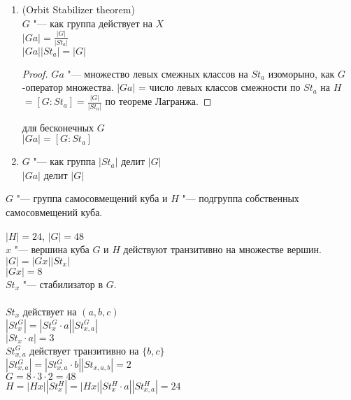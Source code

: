 \begin{conseq}\hfill
\begin{enumerate}
\item (Orbit Stabilizer theorem)\\
$G$ "--- как группа действует на $X$\\
$|Ga| = \frac{|G|}{|St_a|}$\\
$|Ga||St_a| = |G|$\\
\begin{proof}
$Ga$ "--- множество левых смежных классов на $St_a$ изоморыно, как $G$-оператор
множества.
$|Ga|$ = число левых классов смежности по $St_a$ на $H$
$= [G \colon St_a] = \frac{|G|}{|St_a|}$ по теореме Лагранжа.
\end{proof}
\begin{Rem}
для бесконечных $G$\\
$|Ga| = [G \colon St_a]$\\
\end{Rem}
\item
$G$ "--- как группа $|St_a|$ делит $|G|$\\
                    $|Ga|$ делит $|G|$\\
\end{enumerate}
\end{conseq}
\begin{exmp}
$G$ "--- группа самосовмещений куба и $H$ "--- подгруппа собственных самосовмещений куба.

$|H| = 24$, $|G| = 48$\\

$x$ "--- вершина куба $G$ и $H$ действуют транзитивно на множестве вершин.\\
$|G| = |Gx||St_x|$\\
$|Gx| = 8$\\
$St_x$ "--- стабилизатор в $G$.\\
\\
$St_x$ действует на $(a, b, c)$\\
$|St_x^{G}| = |St_x^{G}\cdot a||St_{x, a}^{G}|$\\
$|St_x \cdot a| = 3$\\
$St_{x, a}^{G}$ действует транзитивно на $\{b, c\}$\\
$|St_{x, a}^{G}| = |St_{x, a}^{G}\cdot b||St_{x, a, b}| = 2$\\

$G = 8 \cdot 3 \cdot 2 = 48$\\
$H = |Hx||St_x^{H}| = |Hx||St_x^{H}\cdot a||St_{x,a}^{H}| = 24$\\
\end{exmp}
